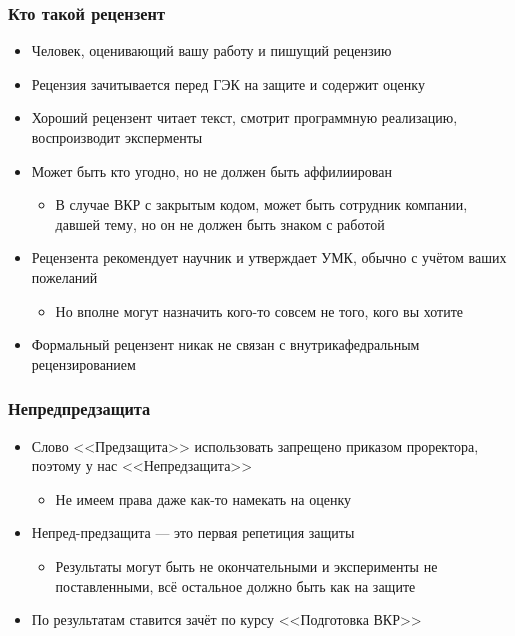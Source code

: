 \documentclass[xetex,mathserif,serif]{beamer}
\begin{document}
    \begin{frame}
        \frametitle{Кто такой рецензент}
        \begin{itemize}
            \item Человек, оценивающий вашу работу и пишущий рецензию
            \item Рецензия зачитывается перед ГЭК на защите и содержит оценку
            \item Хороший рецензент читает текст, смотрит программную реализацию, воспроизводит эксперменты
            \item Может быть кто угодно, но не должен быть аффилиирован
            \begin{itemize}
                \item В случае ВКР с закрытым кодом, может быть сотрудник компании, давшей тему, но он не должен быть знаком с работой
            \end{itemize}
            \item Рецензента рекомендует научник и утверждает УМК, обычно с учётом ваших пожеланий
            \begin{itemize}
                \item Но вполне могут назначить кого-то совсем не того, кого вы хотите
            \end{itemize}
            \item Формальный рецензент никак не связан с внутрикафедральным рецензированием
        \end{itemize}
    \end{frame}

    \begin{frame}
        \frametitle{Непредпредзащита}
        \begin{itemize}
            \item Слово <<Предзащита>> использовать запрещено приказом проректора, поэтому у нас <<Непредзащита>>
            \begin{itemize}
                \item Не имеем права даже как-то намекать на оценку
            \end{itemize}
            \item Непред-предзащита --- это первая репетиция защиты
            \begin{itemize}
                \item Результаты могут быть не окончательными и эксперименты не поставленными, всё остальное должно быть как на защите
            \end{itemize}
            \item По результатам ставится зачёт по курсу <<Подготовка ВКР>>
        \end{itemize}
    \end{frame}
\end{document}
